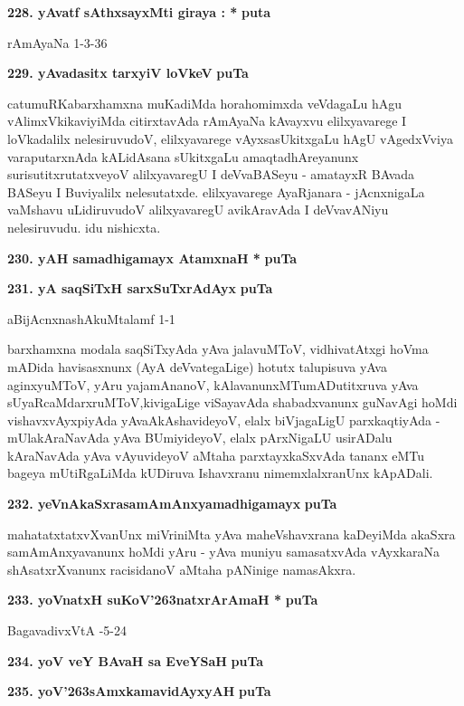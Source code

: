 \medskip
\noindent
\textbf{228. yAvatf sAthxsayxMti giraya : *} \hfill{\bf puta \pageref{77}}

\hfill{rAmAyaNa 1-3-36}

\medskip
\noindent
\textbf{229. yAvadasitx tarxyiV loVkeV} \hfill{\bf puTa \pageref{20}}

\smallskip
catumuRKabarxhamxna muKadiMda horahomimxda veVdagaLu hAgu vAlimxVki\-kaviyiMda citirxtavAda rAmAyaNa kAvayxvu elilxyavarege I loVkadalilx nelesiruvudoV, elilxyavarege vAyxsasUkitxgaLu hAgU vAgedxVviya varaputarxnAda kALidAsana sUkitxgaLu amaqtadhAreyanunx surisutitxrutatxveyoV alilxyava\-regU I deVvaBASeyu - amatayxR BAvada BASeyu I Buviyalilx nelesutatxde. elilxyavarege AyaR\-janara - jAcnxnigaLa vaMshavu uLidiruvudoV alilxyavaregU avikAravAda I deVvavANiyu nelesiruvudu. idu nishicxta.

\medskip
\noindent
\textbf{230. yAH samadhigamayx AtamxnaH *} \hfill{\bf puTa \pageref{94}}

\medskip
\noindent
\textbf{231. yA saqSiTxH sarxSuTxrAdAyx} \hfill{\bf puTa \pageref{243}}

\hfill{aBijAcnxnashAkuMtalamf 1-1}

\smallskip
barxhamxna modala saqSiTxyAda yAva jalavuMToV, vidhivatAtxgi hoVma \hbox{mADida} havisasxnunx (AyA deVvategaLige) hotutx talupisuva yAva aginxyuMToV, yAru yajamAnanoV, kAlavanunxMTu\-mADutitxruva yAva sUyaRcaMdarxruMToV,\break kivigaLige viSayavAda shabadxvanunx guNavAgi hoMdi vishavxvAyxpiyAda yAva\break AkAshavideyoV, elalx biVjagaLigU parxkaqtiyAda - mUlakAraNavAda yAva BUmiyideyoV, elalx pArxNigaLU usirADalu kAraNavAda yAva vAyu\-videyoV aMtaha parxtayxkaSx\-vAda tananx eMTu bageya mUtiRgaLiMda kUDiruva Ishavxranu nimemxlalxranUnx kApADali.

\medskip
\noindent
\textbf{232. yeVnAkaSxrasamAmAnxyamadhigamayx} \hfill{\bf puTa \pageref{157}}

\smallskip
mahatatxtatxvXvanUnx miVriniMta yAva maheVshavxrana kaDeyiMda akaSxra samA\-mAnxyavanunx hoMdi yAru - yAva muniyu samasatxvAda vAyxkaraNa shAsatxrX\-vanunx racisidanoV aMtaha pANinige namasAkxra.

\medskip
\noindent
\textbf{233. yoVnatxH suKoV\char'263natxrArAmaH *} \hfill{\bf puTa \pageref{134}}

\hfill{BagavadivxVtA -5-24}

\medskip
\noindent
\textbf{234. yoV veY BAvaH sa EveYSaH} \hfill{\bf puTa \pageref{227}}

\medskip
\noindent
\textbf{235. yoV\char'263sAmxkamavidAyxyAH} \hfill{\bf puTa \pageref{103}}


